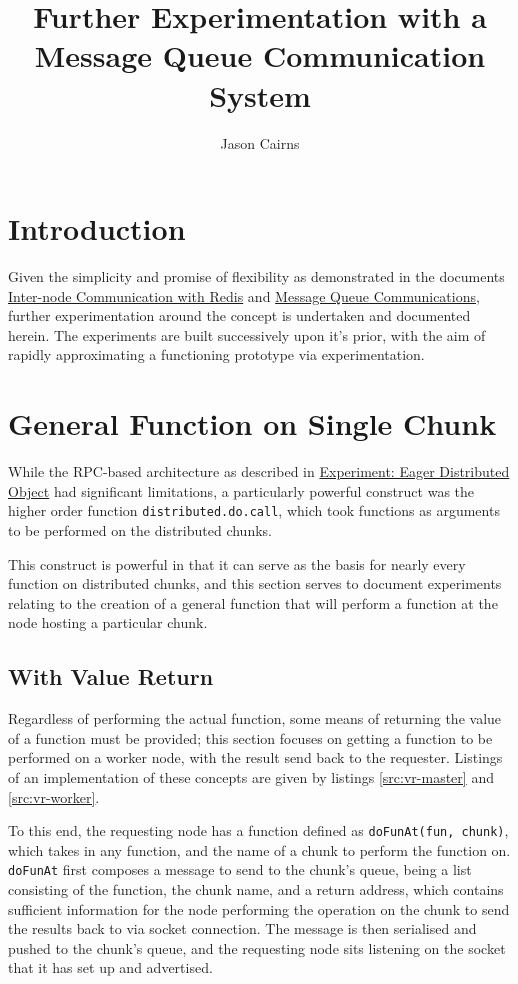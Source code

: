 \documentclass[a4paper,10pt]{article}
\begin{document}
\title{Further Experimentation with a Message Queue Communication System}
\author{Jason Cairns}
  
\maketitle{}

\section{Introduction}

Given the simplicity and promise of flexibility as demonstrated in the
documents \href{inter-node-comm-w-redis.pdf}{Inter-node Communication with
Redis} and \href{message-queues-comms.pdf}{Message Queue Communications},
further experimentation around the concept is undertaken and documented herein.
The experiments are built successively upon it's prior, with the aim of rapidly
approximating a functioning prototype via experimentation.

\section{General Function on Single Chunk}

While the RPC-based architecture as described in
\href{experiment-eager-dist-obj-pre.pdf}{Experiment: Eager Distributed Object}
had significant limitations, a particularly powerful construct was the higher
order function \texttt{distributed.do.call}, which took functions as arguments
to be performed on the distributed chunks.

This construct is powerful in that it can serve as the basis for nearly every
function on distributed chunks, and this section serves to document experiments
relating to the creation of a general function that will perform a function at
the node hosting a particular chunk.

\subsection{With Value Return}

Regardless of performing the actual function, some means of returning the value
of a function must be provided; this section focuses on getting a function to
be performed on a worker node, with the result send back to the requester.
Listings of an implementation of these concepts are given by listings
\ref{src:vr-master} and \ref{src:vr-worker}.

To this end, the requesting node has a function defined as \texttt{doFunAt(fun,
chunk)}, which takes in any function, and the name of a chunk to perform the
function on.
\texttt{doFunAt} first composes a message to send to the chunk's queue, being a
list consisting of the function, the chunk name, and a return address, which
contains sufficient information for the node performing the operation on the
chunk to send the results back to via socket connection.
The message is then serialised and pushed to the chunk's queue, and the
requesting node sits listening on the socket that it has set up and advertised.
\end{document}
